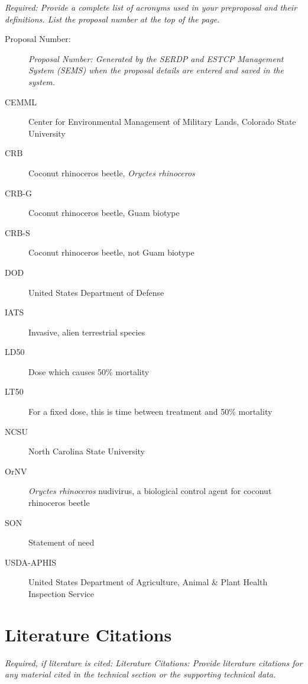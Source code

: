 \documentclass[11pt,english,letterpaper]{scrartcl}
\begin{document}
\textit{Required: Provide a complete list of acronyms used in your preproposal and their definitions. List the proposal number at the top of the page.} \\

\begin{description}
	\item[Proposal Number:] \emph{Proposal Number: Generated by the SERDP and ESTCP Management System (SEMS) when the proposal details are entered and saved in the system.}
\end{description}

\begin{description}
	\item[CEMML] Center for Environmental Management of Military Lands, Colorado State University
	\item[CRB] Coconut rhinoceros beetle, \textit{Oryctes rhinoceros}
	\item[CRB-G] Coconut rhinoceros beetle, Guam biotype
	\item[CRB-S] Coconut rhinoceros beetle, not Guam biotype
	\item[DOD] United States Department of Defense
	\item[IATS] Invasive, alien terrestrial species
	\item[LD50] Dose which causes 50\% mortality
	\item[LT50] For a fixed dose, this is time between treatment and 50\% mortality
	\item[NCSU] North Carolina State University
	\item[OrNV] \textit{Oryctes rhinoceros} nudivirus, a biological control agent for coconut rhinoceros beetle
	\item[SON] Statement of need
	\item[USDA-APHIS] United States Department of Agriculture, Animal \& Plant Health Inspection Service
\end{description}

\clearpage

\section{Literature Citations}

\textit{Required, if literature is cited: Literature Citations: Provide literature citations for any material cited in the technical section or the supporting technical data.} \\
\end{document}
